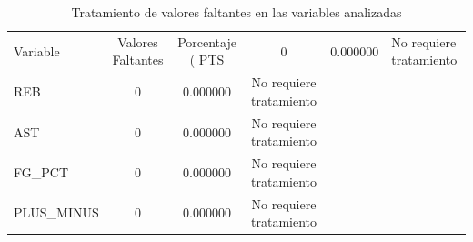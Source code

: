 \begin{table}
\caption{Tratamiento de valores faltantes en las variables analizadas}
\label{tab:valores_faltantes}
\begin{tabular}{lccc}
\toprule
Variable & Valores Faltantes & Porcentaje (%
\midrule
PTS & 0 & 0.000000 & No requiere tratamiento \\
REB & 0 & 0.000000 & No requiere tratamiento \\
AST & 0 & 0.000000 & No requiere tratamiento \\
FG_PCT & 0 & 0.000000 & No requiere tratamiento \\
PLUS_MINUS & 0 & 0.000000 & No requiere tratamiento \\
\bottomrule
\end{tabular}
\end{table}
